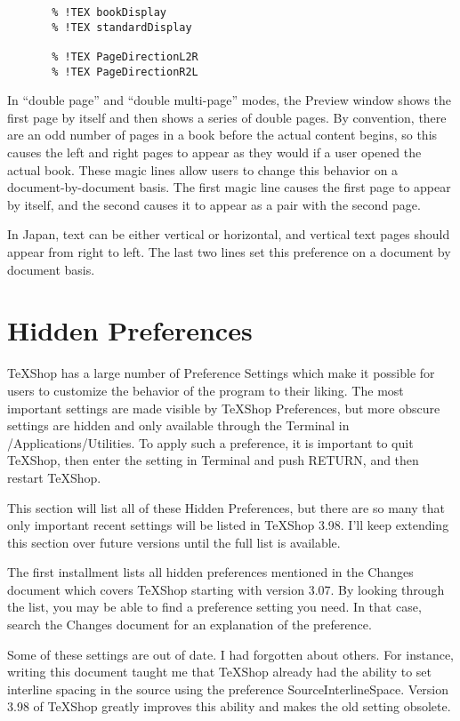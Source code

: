 \documentclass[11pt, oneside]{article}   	%
\begin{document}
\newpage
\begin{verbatim}
       % !TEX bookDisplay
       % !TEX standardDisplay
       
       % !TEX PageDirectionL2R
       % !TEX PageDirectionR2L
\end{verbatim}

In ``double page'' and ``double multi-page'' modes, the Preview window shows the first page by itself and then shows a series of double pages. By convention, there are an odd number of pages in a book before the actual content begins, so this causes the left and right pages to appear as they would if a user opened the actual book.  These magic lines allow users to change this behavior on a document-by-document basis. The first magic line causes the first page to appear by itself, and the second causes it to appear as a pair with the second page.

 In Japan, text can be either vertical or horizontal, and vertical text pages should appear from right to left.  The last two lines set this preference on a document by document basis.


 
\section{Hidden Preferences}
TeXShop has a large number of Preference Settings which make it possible for users to customize the behavior of the program to their liking. The most important settings are made visible by TeXShop Preferences, but more obscure settings are hidden and only available through the Terminal in /Applications/Utilities. To apply such a preference, it is important to quit TeXShop, then enter the setting in Terminal and push RETURN, and then restart TeXShop. 

This section will list all of these Hidden Preferences, but there are so many that only important recent settings will be listed in TeXShop 3.98. I'll keep extending this section over future versions until the full list is available. 

The first installment lists all hidden preferences mentioned in the Changes document which covers TeXShop starting with version 3.07. By looking through the list, you may be able to find a preference setting you need. In that case, search the Changes document for an explanation of the preference. 

Some of these settings are out of date. I had forgotten about others. For instance, writing this document taught me that TeXShop already had the ability to set interline spacing in the source using the preference SourceInterlineSpace. Version 3.98 of TeXShop greatly improves this ability and makes the old setting obsolete.
\end{document}
